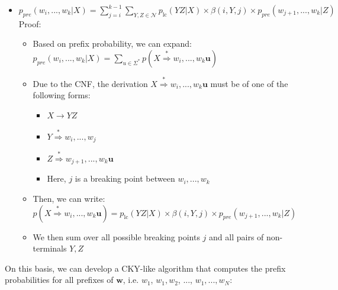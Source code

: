 \begin{itemize}
    \item $p_{pre}(w_i, ..., w_k |X) = \sum_{j=i}^{k-1} \sum_{Y,Z \in \mathcal{N}} p_{\text{lc}} (YZ |X) \times \beta(i,Y,j) \times p_{pre}(w_{j+1}, ..., w_k |Z)$\\
    Proof:
    \begin{itemize}
        \item Based on prefix probability, we can expand: $p_{pre}(w_i, ..., w_k |X) = \sum_{u \in \Sigma^*} p(X \stackrel{*}{\Rightarrow} w_i, ..., w_k \boldsymbol{u})$
        \item Due to the CNF, the derivation $X \stackrel{*}{\Rightarrow} w_i, ..., w_k \boldsymbol{u}$ must be of one of the following forms:
        \begin{itemize}
            \item $X \to YZ$
            \item $Y \stackrel{*}{\Rightarrow} w_i, ..., w_j$
            \item $Z \stackrel{*}{\Rightarrow} w_{j+1}, ..., w_k \boldsymbol{u}$
            \item Here, $j$ is a breaking point between $w_i, ..., w_k$
        \end{itemize}
        \item Then, we can write: $p(X \stackrel{*}{\Rightarrow} w_i, ..., w_k \boldsymbol{u}) = p_{\text{lc}} (YZ |X) \times \beta(i,Y,j) \times p_{pre}(w_{j+1}, ..., w_k |Z)$
        \item We then sum over all possible breaking points $j$ and all pairs of non-terminals $Y,Z$
    \end{itemize}
\end{itemize}
On this basis, we can develop a CKY-like algorithm that computes the prefix probabilities for all prefixes of $\boldsymbol{w}$, i.e. $w_1$, $w_1,w_2$, ..., $w_1,...,w_N$:
